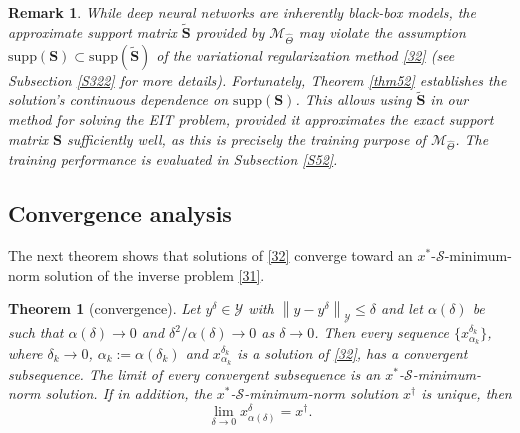 \documentclass[11pt]{article}
\newcommand{\wih}{\widehat}
\newcommand{\wit}{\widetilde}
\newcommand{\bds}[1]{\boldsymbol{#1}}
\newtheorem{theorem}{Theorem}[section]
\newtheorem{remark}{Remark}[section]
\begin{document}
\begin{remark}\label{R3}\rm
While deep neural networks are inherently black-box models, the approximate support matrix $ \wit{\bds{S}} $ provided by $\mathcal{M}_{\wih{\Theta}}$ may violate the assumption $ \mathrm{supp}(\bds{S})\subset\mathrm{supp}(\wit{\bds{S}}) $ of the variational regularization method \eqref{32} (see Subsection \ref{S322} for more details).
Fortunately, Theorem \ref{thm52} establishes the solution's continuous dependence on $ \mathrm{supp}(\bds{S}) $.
This allows using $ \wit{\bds{S}} $ in our method for solving the EIT problem, provided it approximates the exact support matrix $ \bds{S} $ sufficiently well, as this is precisely the training purpose of $ \mathcal{M}_{\widehat{\Theta}} $.
The training performance is evaluated in Subsection \ref{S52}.
\end{remark}%

\subsection{Convergence analysis}\label{A2}

The next theorem shows that solutions of \eqref{32} converge toward an $ x^* $-$ \mathcal{S} $-minimum-norm solution of the inverse problem \eqref{31}.


\begin{theorem}[convergence]\label{thm53}
Let $ y^\delta\in \mathcal{Y} $ with $ \left\|y - y^\delta\right\|_\mathcal{Y}\leq \delta $ and let $ \alpha(\delta) $ be such that $ \alpha(\delta)\to 0 $ and $ \delta^2/\alpha(\delta) \to 0 $ as $ \delta\to 0 $.
Then every sequence $ \{x_{\alpha_k}^{\delta_k}\} $, where $ \delta_k\to 0 $, $ \alpha_k:= \alpha(\delta_k) $ and $ x_{\alpha_k}^{\delta_k} $ is a solution of \eqref{32}, has a convergent subsequence. The limit of every convergent subsequence is an $ x^* $-$\mathcal{S}$-minimum-norm solution. 
If in addition, the $ x^* $-$\mathcal{S}$-minimum-norm solution $ x^\dagger $ is unique, then
\begin{displaymath}
\lim_{\delta\to 0}x^\delta_{\alpha(\delta)} = x^\dagger.
\end{displaymath}
\end{theorem}
\end{document}
